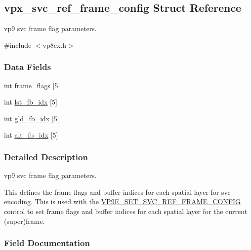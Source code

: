 \hypertarget{structvpx__svc__ref__frame__config}{}\subsection{vpx\+\_\+svc\+\_\+ref\+\_\+frame\+\_\+config Struct Reference}
\label{structvpx__svc__ref__frame__config}


vp9 svc frame flag parameters.  




{\ttfamily \#include $<$vp8cx.\+h$>$}

\subsubsection*{Data Fields}
\begin{DoxyCompactItemize}
\item 
int \hyperlink{structvpx__svc__ref__frame__config_ad0981cd49c317dff4cdf7078a0440545}{frame\+\_\+flags} \mbox{[}5\mbox{]}
\item 
int \hyperlink{structvpx__svc__ref__frame__config_a19b5483bc516fc83469d5967dc966783}{lst\+\_\+fb\+\_\+idx} \mbox{[}5\mbox{]}
\item 
int \hyperlink{structvpx__svc__ref__frame__config_a4af48b570c3262ad1d6fc7d436a7d5cc}{gld\+\_\+fb\+\_\+idx} \mbox{[}5\mbox{]}
\item 
int \hyperlink{structvpx__svc__ref__frame__config_ab2a913dc166956efad8bdf6ad009b2eb}{alt\+\_\+fb\+\_\+idx} \mbox{[}5\mbox{]}
\end{DoxyCompactItemize}


\subsubsection{Detailed Description}
vp9 svc frame flag parameters. 

This defines the frame flags and buffer indices for each spatial layer for svc encoding. This is used with the \hyperlink{group__vp8__encoder_gga6deae3d561c838952552c3d3756322ecaa0d822d0d1efa1868ce05d8523a8836b}{V\+P9\+E\+\_\+\+S\+E\+T\+\_\+\+S\+V\+C\+\_\+\+R\+E\+F\+\_\+\+F\+R\+A\+M\+E\+\_\+\+C\+O\+N\+F\+IG} control to set frame flags and buffer indices for each spatial layer for the current (super)frame. 

\subsubsection{Field Documentation}
